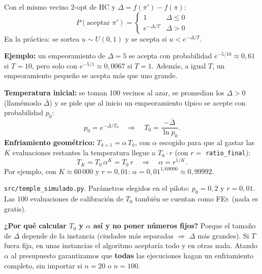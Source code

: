 \documentclass[11pt,a4paper]{article}
\newcommand{\FEs}{\textsc{FEs}}
\newcommand{\archivo}[1]{\texttt{#1}}
\begin{document}
\begin{mate}
Con el mismo vecino 2-opt de HC y $\Delta=f(\pi')-f(\pi)$:
\[
P(\text{aceptar } \pi')=\begin{cases}1 & \Delta\le 0\\[2pt] e^{-\Delta/T} & \Delta>0\end{cases}
\]
En la práctica: se sortea $u\sim U(0,1)$ y se acepta si $u<e^{-\Delta/T}$.

\textbf{Ejemplo:} un empeoramiento de $\Delta=5$ se acepta con probabilidad $e^{-5/10}\approx0{,}61$ si $T=10$,
pero solo con $e^{-5/1}\approx0{,}0067$ si $T=1$.
Además, a igual $T$, un empeoramiento pequeño se acepta más que uno grande.
\end{mate}

\begin{mate}
\textbf{Temperatura inicial:} se toman 100 vecinos al azar, se promedian los $\Delta>0$ (llamémoslo $\bar\Delta$) y se pide que al inicio
un empeoramiento típico se acepte con probabilidad $p_0$:
\[
p_0=e^{-\bar\Delta/T_0}\quad\Longrightarrow\quad T_0=\frac{-\bar\Delta}{\ln p_0}.
\]
\textbf{Enfriamiento geométrico:} $T_{k+1}=\alpha\,T_k$, con $\alpha$ escogido para que al gastar las $K$ evaluaciones restantes
la temperatura llegue a $T_0\cdot r$ (con $r=$ \texttt{ratio\_final}):
\[
T_K=T_0\,\alpha^K=T_0\,r\quad\Longrightarrow\quad \alpha=r^{1/K}.
\]
Por ejemplo, con $K\approx60\,000$ y $r=0{,}01$: $\alpha=0{,}01^{1/60000}\approx0{,}99992$.
\end{mate}

\begin{codigo}
\archivo{src/temple\_simulado.py}. Parámetros elegidos en el piloto: $p_0=0{,}2$ y $r=0{,}01$.
Las 100 evaluaciones de calibración de $T_0$ también se cuentan como \FEs\ (nada es gratis).
\end{codigo}

\begin{porque}
\textbf{¿Por qué calcular $T_0$ y $\alpha$ así y no poner números fijos?} Porque el tamaño de $\Delta$ depende de la instancia
(ciudades más separadas $\Rightarrow$ $\Delta$ más grandes). Si $T$ fuera fija, en unas instancias el algoritmo aceptaría todo y en otras nada.
Atando $\alpha$ al presupuesto garantizamos que \textbf{todas} las ejecuciones hagan un enfriamiento completo, sin importar si $n=20$ o $n=100$.
\end{porque}

\end{document}
